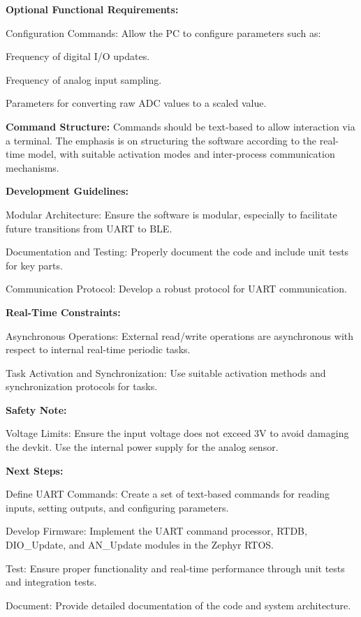 {\bfseries{Optional Functional Requirements\+:}}
\begin{DoxyItemize}
\item Configuration Commands\+: Allow the PC to configure parameters such as\+:
\begin{DoxyItemize}
\item Frequency of digital I/O updates.
\item Frequency of analog input sampling.
\item Parameters for converting raw ADC values to a scaled value.
\end{DoxyItemize}
\end{DoxyItemize}

{\bfseries{Command Structure\+:}} Commands should be text-\/based to allow interaction via a terminal. The emphasis is on structuring the software according to the real-\/time model, with suitable activation modes and inter-\/process communication mechanisms.

{\bfseries{Development Guidelines\+:}}
\begin{DoxyItemize}
\item Modular Architecture\+: Ensure the software is modular, especially to facilitate future transitions from UART to BLE.
\item Documentation and Testing\+: Properly document the code and include unit tests for key parts.
\item Communication Protocol\+: Develop a robust protocol for UART communication.
\end{DoxyItemize}

{\bfseries{Real-\/\+Time Constraints\+:}}
\begin{DoxyItemize}
\item Asynchronous Operations\+: External read/write operations are asynchronous with respect to internal real-\/time periodic tasks.
\item Task Activation and Synchronization\+: Use suitable activation methods and synchronization protocols for tasks.
\end{DoxyItemize}

{\bfseries{Safety Note\+:}}
\begin{DoxyItemize}
\item Voltage Limits\+: Ensure the input voltage does not exceed 3V to avoid damaging the devkit. Use the internal power supply for the analog sensor.
\end{DoxyItemize}

{\bfseries{Next Steps\+:}}
\begin{DoxyItemize}
\item Define UART Commands\+: Create a set of text-\/based commands for reading inputs, setting outputs, and configuring parameters.
\item Develop Firmware\+: Implement the UART command processor, RTDB, DIO\+\_\+\+Update, and AN\+\_\+\+Update modules in the Zephyr RTOS.
\item Test\+: Ensure proper functionality and real-\/time performance through unit tests and integration tests.
\item Document\+: Provide detailed documentation of the code and system architecture.
\end{DoxyItemize}

